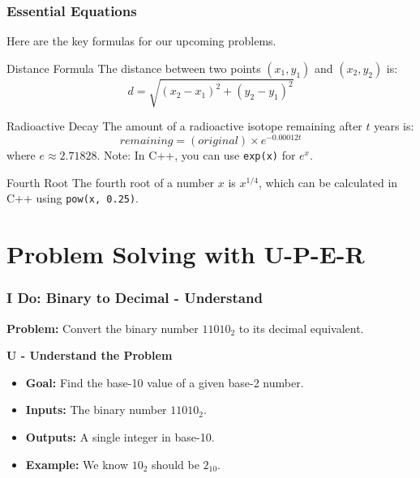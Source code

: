 \documentclass{beamer}
\begin{document}
\begin{frame}
\frametitle{Essential Equations}
Here are the key formulas for our upcoming problems.

\begin{block}{Distance Formula}
The distance between two points $(x_1, y_1)$ and $(x_2, y_2)$ is:
$$ d = \sqrt{(x_2 - x_1)^2 + (y_2 - y_1)^2} $$
\end{block}

\begin{block}{Radioactive Decay}
The amount of a radioactive isotope remaining after $t$ years is:
$$ remaining = (original) \times e^{-0.00012t} $$
where $e \approx 2.71828$. Note: In C++, you can use \texttt{exp(x)} for $e^x$.
\end{block}

\begin{block}{Fourth Root}
The fourth root of a number $x$ is $x^{1/4}$, which can be calculated in C++ using \texttt{pow(x, 0.25)}.
\end{block}
\end{frame}

\section{Problem Solving with U-P-E-R}

\begin{frame}
\frametitle{I Do: Binary to Decimal - Understand}
\textbf{Problem:} Convert the binary number \alert{$11010_2$} to its decimal equivalent.

\vfill
\textbf{U - Understand the Problem}
\begin{itemize}
    \item \textbf{Goal:} Find the base-10 value of a given base-2 number.
    \item \textbf{Inputs:} The binary number $11010_2$.
    \item \textbf{Outputs:} A single integer in base-10.
    \item \textbf{Example:} We know $10_2$ should be $2_{10}$.
\end{itemize}
\end{frame}
\end{document}

